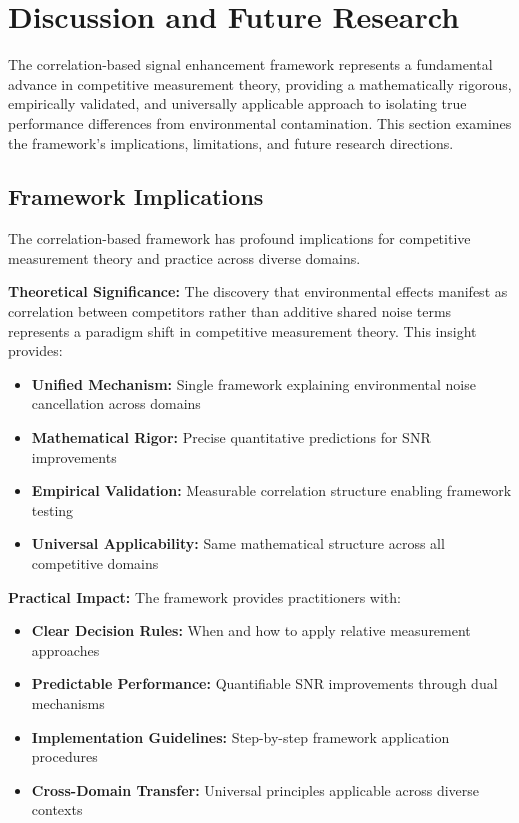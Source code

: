 \section{Discussion and Future Research}

The correlation-based signal enhancement framework represents a fundamental advance in competitive measurement theory, providing a mathematically rigorous, empirically validated, and universally applicable approach to isolating true performance differences from environmental contamination. This section examines the framework's implications, limitations, and future research directions.

\subsection{Framework Implications}

The correlation-based framework has profound implications for competitive measurement theory and practice across diverse domains.

\textbf{Theoretical Significance:}
The discovery that environmental effects manifest as correlation between competitors rather than additive shared noise terms represents a paradigm shift in competitive measurement theory. This insight provides:
\begin{itemize}
    \item \textbf{Unified Mechanism:} Single framework explaining environmental noise cancellation across domains
    \item \textbf{Mathematical Rigor:} Precise quantitative predictions for SNR improvements
    \item \textbf{Empirical Validation:} Measurable correlation structure enabling framework testing
    \item \textbf{Universal Applicability:} Same mathematical structure across all competitive domains
\end{itemize}

\textbf{Practical Impact:}
The framework provides practitioners with:
\begin{itemize}
    \item \textbf{Clear Decision Rules:} When and how to apply relative measurement approaches
    \item \textbf{Predictable Performance:} Quantifiable SNR improvements through dual mechanisms
    \item \textbf{Implementation Guidelines:} Step-by-step framework application procedures
    \item \textbf{Cross-Domain Transfer:} Universal principles applicable across diverse contexts
\end{itemize}

